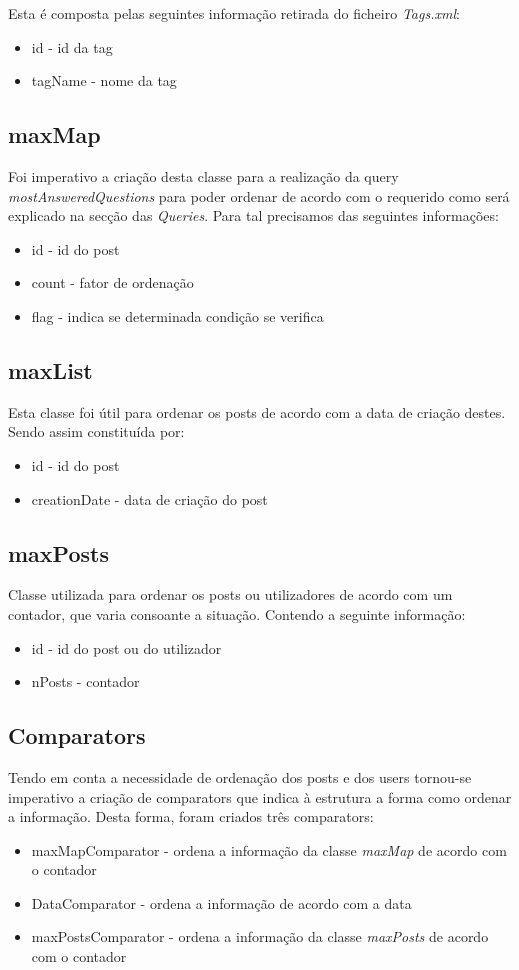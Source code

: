 \documentclass[10pt,a4paper]{article}
\begin{document}
Esta é composta pelas seguintes informação retirada do ficheiro \textit{Tags.xml}:
\begin{itemize}
\item id - id da tag
\item tagName - nome da tag
\end{itemize}

\subsection{maxMap}
Foi imperativo a criação desta classe para a realização da query \textit{mostAnsweredQuestions} para poder ordenar de acordo com o requerido como será explicado na secção das \textit{Queries}. Para tal precisamos das seguintes informações:
\begin{itemize}
\item id - id do post
\item count - fator de ordenação
\item flag - indica se determinada condição se verifica
\end{itemize}

\subsection{maxList}
Esta classe foi útil para ordenar os posts de acordo com a data de criação destes. Sendo assim constituída por:
\begin{itemize}
\item id - id do post
\item creationDate - data de criação do post
\end{itemize}

\subsection{maxPosts}
Classe utilizada para ordenar os posts ou utilizadores de acordo com um contador, que varia consoante a situação. Contendo a seguinte informação:
\begin{itemize}
\item id - id do post ou do utilizador
\item nPosts - contador
\end{itemize}

\subsection{Comparators}
Tendo em conta a necessidade de ordenação dos posts e dos users tornou-se imperativo a criação de comparators que indica à estrutura a forma como ordenar a informação.
Desta forma, foram criados três comparators:
\begin{itemize}
\item maxMapComparator - ordena a informação da classe \textit{maxMap} de acordo com o contador
\item DataComparator - ordena a informação de acordo com a data
\item maxPostsComparator - ordena a informação da classe \textit{maxPosts} de acordo com o contador
\end{itemize}
\end{document}
